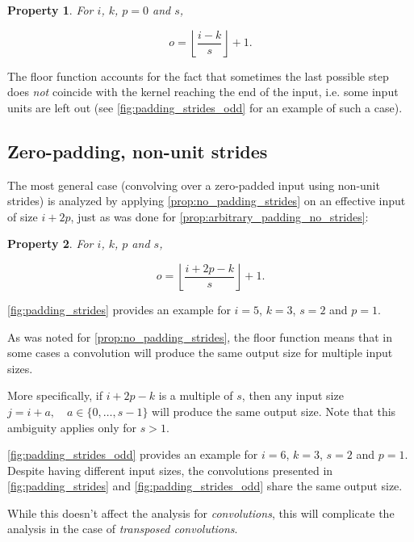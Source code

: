 \documentclass{article}
\newtheorem{prop}{Property}
\begin{document}
\begin{prop}\label{prop:no_padding_strides}
For $i$, $k$, $p = 0$ and $s$,

\begin{equation}
    o = \left\lfloor \frac{i - k}{s} \right\rfloor + 1.
\end{equation}
\end{prop}

The floor function accounts for the fact that sometimes the last possible step
does {\em not} coincide with the kernel reaching the end of the input, i.e.
some input units are left out (see \autoref{fig:padding_strides_odd} for an
example of such a case).

\subsection{Zero-padding, non-unit strides}

The most general case (convolving over a zero-padded input using non-unit
strides) is analyzed by applying \autoref{prop:no_padding_strides} on an
effective input of size $i + 2p$, just as was done for
\autoref{prop:arbitrary_padding_no_strides}:

\begin{prop}\label{prop:padding_strides}
For $i$, $k$, $p$ and $s$,

\begin{equation}
    o = \left\lfloor \frac{i + 2p - k}{s} \right\rfloor + 1.
\end{equation}
\end{prop}

\autoref{fig:padding_strides} provides an example for $i = 5$, $k = 3$, $s = 2$
and $p = 1$.

As was noted for \autoref{prop:no_padding_strides}, the floor function means
that in some cases a convolution will produce the same output size for multiple
input sizes.

More specifically, if $i + 2p - k$ is a multiple of $s$, then any input size $j
= i + a, \quad a \in \{0,\ldots,s - 1\}$ will produce the same output size. Note
that this ambiguity applies only for $s > 1$.

\autoref{fig:padding_strides_odd} provides an example for $i = 6$, $k = 3$, $s =
2$ and $p = 1$. Despite having different input sizes, the convolutions presented
in \autoref{fig:padding_strides} and \autoref{fig:padding_strides_odd} share the
same output size.

While this doesn't affect the analysis for {\em convolutions}, this will
complicate the analysis in the case of {\em transposed convolutions}.



\end{document}
